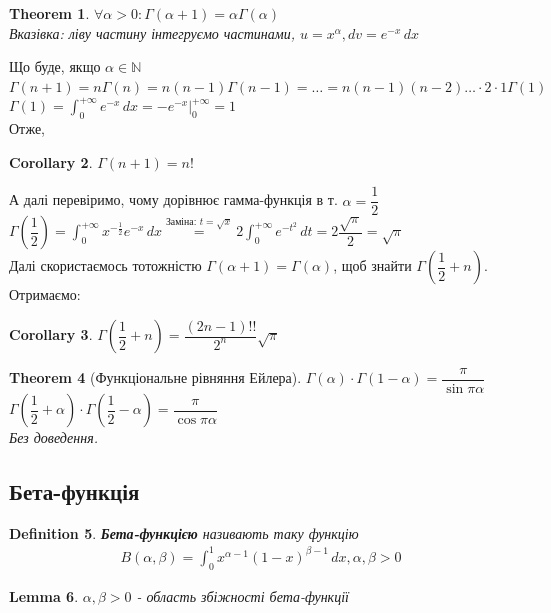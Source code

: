 \documentclass[a4paper, 14pt]{extarticle}
\def\huge{\displaystyle}
\theoremstyle{theoremdd}
\newtheorem{theorem}{Theorem}[subsection]
\theoremstyle{theoremdd}
\newtheorem{definition}[theorem]{Definition}
\theoremstyle{theoremdd}
\theoremstyle{theoremdd}
\theoremstyle{theoremdd}
\theoremstyle{theoremdd}
\theoremstyle{theoremdd}
\newtheorem{lemma}[theorem]{Lemma}
\theoremstyle{theoremdd}
\newtheorem{corollary}[theorem]{Corollary}
\begin{document}
\begin{theorem}
$\forall \alpha > 0: \Gamma (\alpha+1) = \alpha \Gamma (\alpha)$\\
\textit{Вказівка: ліву частину інтегруємо частинами}, $u = x^{\alpha}, dv = e^{-x}\,dx$
\end{theorem}
Що буде, якщо $\alpha \in \mathbb{N}$\\
$\Gamma(n+1) = n \Gamma (n) = n(n-1) \Gamma (n-1) = \dots = n(n-1)(n-2)\dots \cdot 2 \cdot 1 \Gamma (1)$\\
$\Gamma(1) = \huge \int_0^{+\infty} e^{-x}\,dx = -e^{-x} \Big|_{0}^{+\infty} = 1$\\
Отже,
\begin{corollary}
$\Gamma(n+1) = n!$
\end{corollary}
А далі перевіримо, чому дорівнює гамма-функція в т. $\alpha = \dfrac{1}{2}$\\
$\Gamma \left( \dfrac{1}{2} \right) = \huge \int_0^{+\infty} x^{-\frac{1}{2}}e^{-x}\,dx \overset{\textrm{Заміна: } t = \sqrt{x}}{=} 2 \huge \int_0^{+\infty} e^{-t^2}\,dt = 2 \dfrac{\sqrt{\pi}}{2} = \sqrt{\pi}$\\
Далі скористаємось тотожністю $\Gamma(\alpha+1) = \Gamma(\alpha)$, щоб знайти $\Gamma \left( \dfrac{1}{2} + n \right)$. Отримаємо:
\begin{corollary}
$\Gamma \left( \dfrac{1}{2} + n \right) = \dfrac{(2n-1)!!}{2^n} \sqrt{\pi}$
\end{corollary}

\begin{theorem}[Функціональне рівняння Ейлера]
$\Gamma(\alpha) \cdot \Gamma(1-\alpha) = \dfrac{\pi}{\sin \pi \alpha}$\\
$\Gamma \left(\dfrac{1}{2} + \alpha \right) \cdot \Gamma \left(\dfrac{1}{2}-\alpha \right) = \dfrac{\pi}{\cos \pi \alpha}$\\
\textit{Без доведення.}
\end{theorem}

\subsection{Бета-функція}
\begin{definition}
\textbf{Бета-функцією} називають таку функцію
\begin{align*}
B(\alpha,\beta) = \int_0^1 x^{\alpha-1} (1-x)^{\beta-1}\,dx, \alpha,\beta>0
\end{align*}
\end{definition}

\begin{lemma}
$\alpha, \beta >0$ - область збіжності бета-функції
\end{lemma}
\end{document}
